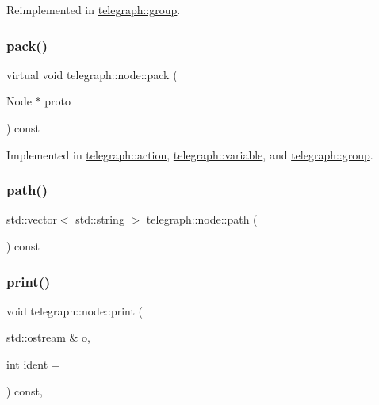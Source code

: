 Reimplemented in \hyperlink{classtelegraph_1_1group_abc407505a0b1d0f1c3de0f588f8ea7a0}{telegraph\+::group}.

\mbox{\label{classtelegraph_1_1node_a5006b21e9b83ecd52f3f953a1b828773}} 
\subsubsection{\texorpdfstring{pack()}{pack()}}
{\footnotesize\ttfamily virtual void telegraph\+::node\+::pack (\begin{DoxyParamCaption}\item[{Node $\ast$}]{proto }\end{DoxyParamCaption}) const\hspace{0.3cm}{\ttfamily [pure virtual]}}



Implemented in \hyperlink{classtelegraph_1_1action_a849370efc692c6c4e7047e3b9c50983c}{telegraph\+::action}, \hyperlink{classtelegraph_1_1variable_a3016d192f7d4328cf1f32273f9431d83}{telegraph\+::variable}, and \hyperlink{classtelegraph_1_1group_a070decfe980bb669646af5307f5c93e4}{telegraph\+::group}.

\mbox{\label{classtelegraph_1_1node_a1f1a005517baad53ec2407c27a13c9c4}} 
\subsubsection{\texorpdfstring{path()}{path()}}
{\footnotesize\ttfamily std\+::vector$<$ std\+::string $>$ telegraph\+::node\+::path (\begin{DoxyParamCaption}{ }\end{DoxyParamCaption}) const}

\mbox{\label{classtelegraph_1_1node_a70ae6b3d07132abcc4022a7ac9facf6b}} 
\subsubsection{\texorpdfstring{print()}{print()}}
{\footnotesize\ttfamily void telegraph\+::node\+::print (\begin{DoxyParamCaption}\item[{std\+::ostream \&}]{o,  }\item[{int}]{ident = {} }\end{DoxyParamCaption}) const\hspace{0.3cm}{\ttfamily [protected]}, {\ttfamily [virtual]}}

